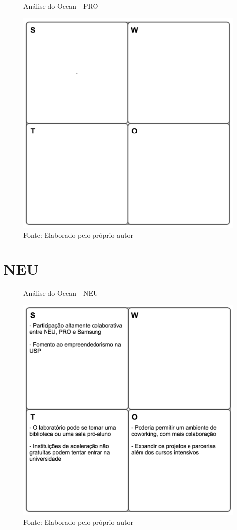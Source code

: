\begin{figure}[H]
\caption{Análise do Ocean - PRO}
\centerline{\includegraphics[scale=0.75]{img/generalswot}}
\label{fig:swotpro}
\caption* {Fonte: Elaborado pelo próprio autor}
\end{figure}

\section{NEU}

\begin{figure}[H]
\caption{Análise do Ocean - NEU}
\centerline{\includegraphics[scale=0.75]{img/neuswot}}
\label{fig:swotneu}
\caption* {Fonte: Elaborado pelo próprio autor}
\end{figure}

